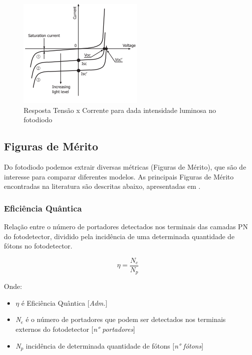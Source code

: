 \begin{figure}[!h]
	\caption{\label{fig_respFotodiodo}Resposta Tensão x Corrente para dada intensidade luminosa no fotodiodo}
	\begin{center}
	    \includegraphics[scale=0.8]{Imagens/graficoRespostaFotodiodo.png}
	\end{center}
\end{figure}

\subsection{Figuras de M\'erito}
Do fotodiodo podemos extrair diversas m\'etricas (Figuras de M\'erito), que são de interesse para comparar diferentes modelos. As principais Figuras de M\'erito encontradas na literatura são descritas abaixo, apresentadas em \cite{LidianeCampos}.

\subsubsection{Eficiência Quântica}
Relação entre o número de portadores detectados nos terminais das camadas PN do fotodetector, dividido pela incidência de uma determinada quantidade de fótons no fotodetector.

\begin{equation}
    \eta = \frac{N_e}{N_p}
\end{equation}

Onde:
\begin{itemize}
    \item \textit{$\eta$} \'e Efici\^encia Qu\^antica [\textit{Adm.}]
    \item \textit{N$_e$} \'e o n\'umero de portadores que podem ser detectados nos terminais externos do fotodetector [\textit{n° portadores}]
    \item \textit{N$_p$} incid\^encia de determinada quantidade de f\'otons [\textit{n° f\'otons}]
\end{itemize}

